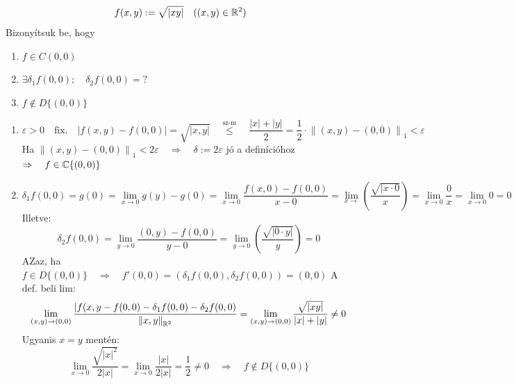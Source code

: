 \documentclass[a4paper,11.5pt]{article}
\newcommand{\norm}[1]{\left\lVert#1\right\rVert}
\begin{document}
	\begin{task}
		\[ f(x,y):=\sqrt{|xy|}\quad ((x,y)\in\mathbb{R}^2) \]
		Bizonyítsuk be, hogy \begin{enumerate}
			\item $f\in C(0,0)$
			\item $\exists\delta_1f(0,0);\quad \delta_2f(0,0)=?$
			\item $f\notin D\{(0,0)\}$
		\end{enumerate}
		\begin{enumerate}
			\item 
			\[ \varepsilon>0\quad \text{fix.}\quad |f(x,y)-f(0,0)|=\sqrt{|x,y|}\quad \overset{\text{sz-m}}{\leq}\quad \frac{|x|+|y|}{2}=\frac{1}{2}\cdot\norm{(x,y)-(0,0)}_1<\varepsilon \]
			Ha $\norm{(x,y)-(0,0)}_1<2\varepsilon\quad \Rightarrow\quad \delta:=2\varepsilon$ jó a definícióhoz\quad $\Rightarrow\quad f\in\mathbb{C}\{(0,0)\}$
			\item \[\delta_1f(0,0)=g(0)=\lim_{x\to0}g(y)-g(0)=\lim_{x\to0}\frac{f(x,0)-f(0,0)}{x-0}=\lim_{x\to}\left(\frac{\sqrt{|x\cdot0}}{x}\right)=\lim_{x\to0}\frac{0}{x}=\lim_{x\to0}0=0 \]
			Illetve:
			\[ \delta_2f(0,0)=\lim_{y\to0}\frac{(0,y)-f(0,0)}{y-0}=\lim_{y\to0}\left(\frac{\sqrt{|0\cdot y|}}{y}\right)=0 \]
			AZaz, ha $f\in D\{(0,0)\}\quad \Rightarrow\quad f'(0,0)=(\delta_1f(0,0), \delta_2f(0,0))=(0,0)$
			A def. beli lim:
			\[ \lim_{(x,y)\to(0,0)}\frac{|f(x,y-f(0,0)-\delta_1f(0,0)-\delta_2f(0,0)}{\norm{x,y}_{\R^2}}=\lim_{(x,y)\to(0,0)}\frac{\sqrt{|xy|}}{|x|+|y|}\not=0 \]
			Ugyanis $x=y$ mentén:
			\[ \lim_{x\to0}\frac{\sqrt{|x|^2}}{2|x|}=\lim_{x\to0}\frac{|x|}{2|x|}=\frac{1}{2}\not=0\quad \Rightarrow\quad f\notin D\{(0,0)\} \]
		\end{enumerate}
	\end{task}
\end{document}
